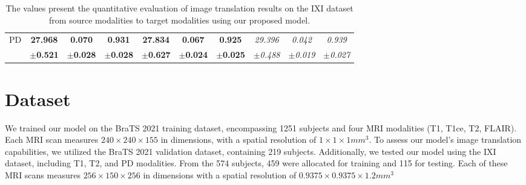 \begin{table*} [ht]
{\begin{tabular}{cccccccccc}
            \multirow{2}{*}{PD} 
            & \textbf{27.968} & \textbf{0.070} & \textbf{0.931} 
            & \textbf{27.834} & \textbf{0.067} & \textbf{0.925} 
            & \textit{29.396} & \textit{0.042} & \textit{0.939} \\
            & \textbf{\footnotesize{$\pm$0.521}} & \textbf{\footnotesize{$\pm$0.028}} & \textbf{\footnotesize{$\pm$0.028}} 
            & \textbf{\footnotesize{$\pm$0.627}} & \textbf{\footnotesize{$\pm$0.024}} & \textbf{\footnotesize{$\pm$0.025}}             & \textit{\footnotesize{$\pm$0.488}} & \textit{\footnotesize{$\pm$0.019}} & \textit{\footnotesize{$\pm$0.027}} \\
            
            \bottomrule
        \end{tabular}
    }
    \vspace{-3pt}
    \caption{The values present the quantitative evaluation of image translation results on the IXI dataset from source modalities to target modalities using our proposed model.} 
    \vspace{-8pt}
    \label{tableD}
\end{table*}

\section{Dataset}
We trained our model on the BraTS 2021 training dataset, encompassing 1251 subjects and four MRI modalities (T1, T1ce, T2, FLAIR). Each MRI scan measures $240\times240\times155$ in dimensions, with a spatial resolution of $1\times1\times1 mm^3$. To assess our model's image translation capabilities, we utilized the BraTS 2021 validation dataset, containing 219 subjects. Additionally, we tested our model using the IXI dataset, including T1, T2, and PD modalities. From the 574 subjects, 459 were allocated for training and 115 for testing. Each of these MRI scans measures $256\times150\times256$ in dimensions with a spatial resolution of $0.9375\times0.9375\times1.2 mm^3$



